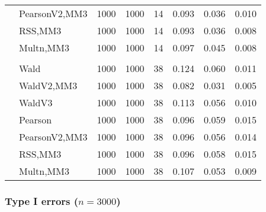\documentclass[
]{article}
\begin{document}
\begin{table}[H]
{\begin{tabular}[t]{llrrrrrr}
\hspace{1em} & PearsonV2,MM3 & 1000 & 1000 & 14 & 0.093 & 0.036 & 0.010\\

\hspace{1em} & RSS,MM3 & 1000 & 1000 & 14 & 0.093 & 0.036 & 0.008\\

\hspace{1em} & Multn,MM3 & 1000 & 1000 & 14 & 0.097 & 0.045 & 0.008\\
\cmidrule{1-8}
\addlinespace[0.3em]
\multicolumn{8}{l}{\textbf{3F 15V}}\\
\hspace{1em} & Wald & 1000 & 1000 & 38 & 0.124 & 0.060 & 0.011\\

\hspace{1em} & WaldV2,MM3 & 1000 & 1000 & 38 & 0.082 & 0.031 & 0.005\\

\hspace{1em} & WaldV3 & 1000 & 1000 & 38 & 0.113 & 0.056 & 0.010\\

\hspace{1em} & Pearson & 1000 & 1000 & 38 & 0.096 & 0.059 & 0.015\\

\hspace{1em} & PearsonV2,MM3 & 1000 & 1000 & 38 & 0.096 & 0.056 & 0.014\\

\hspace{1em} & RSS,MM3 & 1000 & 1000 & 38 & 0.096 & 0.058 & 0.015\\

\hspace{1em} & Multn,MM3 & 1000 & 1000 & 38 & 0.107 & 0.053 & 0.009\\
\bottomrule
\end{tabular}}
\end{table}

\hypertarget{type-i-errors-n3000}{%
\subsubsection{\texorpdfstring{Type I errors
(\(n=3000\))}{Type I errors (n=3000)}}\label{type-i-errors-n3000}}
\end{document}
